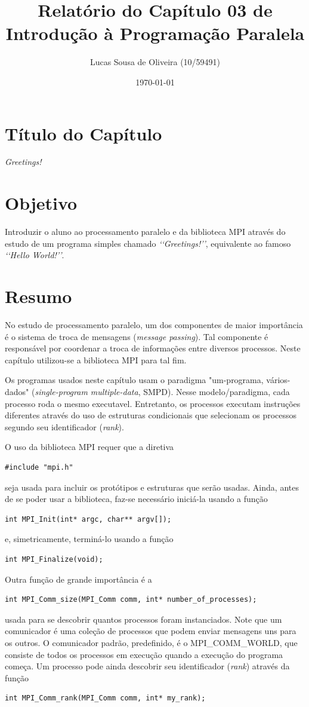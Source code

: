 \documentclass[11pt,a4paper,onecolumn]{article}
\title{Relatório do Capítulo 03 de\\Introdução à Programação Paralela}
\author{Lucas Sousa de Oliveira (10/59491)}
\date{\today}
\begin{document}
\maketitle

\section{Título do Capítulo}
\textit{Greetings!}

\section{Objetivo}
Introduzir o aluno ao processamento paralelo e da biblioteca MPI através do estudo de um programa simples chamado \textit{\lq\lq{}Greetings!\rq\rq{}}, equivalente ao famoso \textit{\lq\lq{}Hello World!\rq\rq{}}.
\section{Resumo}
\label{sec:resumo}
No estudo de processamento paralelo, um dos componentes de maior importância é o sistema de troca de mensagens (\textit{message passing}).
Tal componente é responsável por coordenar a troca de informações entre diversos processos.
Neste capítulo utilizou-se a biblioteca MPI para tal fim.

Os programas usados neste capítulo usam o paradigma "um-programa, vários-dados" (\textit{single-program multiple-data}, SMPD).
Nesse modelo/paradigma, cada processo roda o mesmo executavel.
Entretanto, os processos executam instruções diferentes através do uso de estruturas condicionais que selecionam os processos segundo seu identificador (\textit{rank}).

O uso da biblioteca MPI requer que a diretiva
\begin{lstlisting}[style=cc,numbers=none]
#include "mpi.h"
\end{lstlisting}
seja usada para incluir os protótipos e estruturas que serão usadas.
Ainda, antes de se poder usar a biblioteca, faz-se necessário iniciá-la usando a função
\begin{lstlisting}[style=cc,numbers=none]
int MPI_Init(int* argc, char** argv[]);
\end{lstlisting}
e, simetricamente, terminá-lo usando a função
\begin{lstlisting}[style=cc,numbers=none]
int MPI_Finalize(void);
\end{lstlisting}
Outra função de grande importância é a
\begin{lstlisting}[style=cc,numbers=none]
int MPI_Comm_size(MPI_Comm comm, int* number_of_processes);
\end{lstlisting}
usada para se descobrir quantos processos foram instanciados.
Note que um comunicador é uma coleção de processos que podem enviar mensagens uns para os outros.
O comunicador padrão, predefinido, é o MPI\_COMM\_WORLD, que consiste de todos os processos em execução quando a execução do programa começa.
Um processo pode ainda descobrir seu identificador (\textit{rank}) através da função
\begin{lstlisting}[style=cc,numbers=none]
int MPI_Comm_rank(MPI_Comm comm, int* my_rank);
\end{lstlisting}
\end{document}
